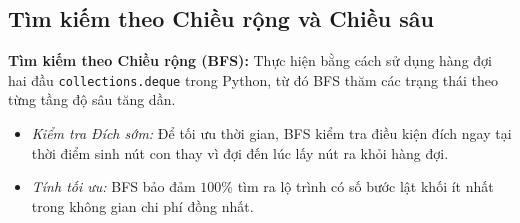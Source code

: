 \begin{table}[H]
\centering
\caption{So sánh độ phức tạp lý thuyết của các giải thuật tìm kiếm}
\label{tab:algorithm_complexity_comparison}
\end{table}

\subsection{Tìm kiếm theo Chiều rộng và Chiều sâu}
\label{subsec:bfs_dfs_impl}

\noindent
\textbf{Tìm kiếm theo Chiều rộng (BFS):}
Thực hiện bằng cách sử dụng hàng đợi hai đầu \texttt{collections.deque} trong Python, từ đó
BFS thăm các trạng thái theo từng tầng độ sâu tăng dần.
\begin{itemize}[--]
    \item \textit{Kiểm tra Đích sớm:}
    Để tối ưu thời gian, BFS kiểm tra điều kiện đích ngay tại thời điểm
    sinh nút con thay vì đợi đến lúc lấy nút ra khỏi hàng đợi.
    \item \textit{Tính tối ưu:} BFS bảo đảm $100\%$ tìm ra lộ trình có số
    bước lật khối ít nhất trong không gian chi phí đồng nhất.
\end{itemize}

